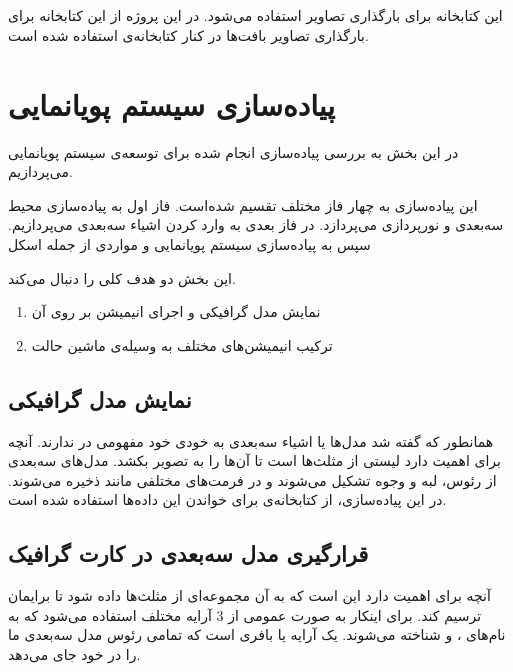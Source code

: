   
\subsection{}

این کتابخانه برای بارگذاری تصاویر استفاده می‌شود. در این پروژه از این کتابخانه برای بارگذاری
تصاویر بافت‌ها در کنار کتابخانه‌ی 
استفاده شده است.
\cite{stb}


\section{پیاده‌سازی سیستم پویانمایی}

در این بخش به بررسی پیاده‌سازی انجام شده برای توسعه‌ی سیستم پویانمایی 
می‌پردازیم.



این پیاده‌سازی به چهار فاز مختلف تقسیم شده‌است.
فاز اول به پیاده‌سازی محیط سه‌بعدی و نورپردازی می‌پردازد. 
در فاز بعدی به وارد کردن اشیاء سه‌بعدی می‌پردازیم.
سپس به پیاده‌سازی سیستم پویانمایی و مواردی از جمله اسکل

این بخش دو هدف کلی را دنبال می‌کند.

\begin{enumerate}
	\item نمایش مدل گرافیکی و اجرای انیمیشن بر روی ‌آن
	\item ترکیب انیمیشن‌های مختلف به وسیله‌ی ماشین حالت

\end{enumerate}

\subsection{نمایش مدل گرافیکی}

همانطور که گفته شد مدل‌ها یا اشیاء سه‌بعدی به خودی خود مفهومی در 
ندارند. آنچه برای 
اهمیت دارد لیستی از مثلث‌ها است تا آن‌ها را به تصویر بکشد.
مدل‌های سه‌بعدی از رئوس، لبه و وجوه تشکیل می‌شوند و در فرمت‌های مختلفی مانند
ذخیره می‌شوند. در این پیا‌ده‌سازی، از کتابخانه‌ی 
برای خواندن این داده‌ها استفاده شده است.

\subsection{قرارگیری مدل سه‌بعدی در کارت گرافیک}

آنچه برای 
 اهمیت دارد این است که به آن مجموعه‌ای از مثلث‌ها داده شود تا برایمان ترسیم کند.
برای اینکار به صورت عمومی از 3 آرایه مختلف استفاده می‌شود که به نام‌های 
،
و 
شناخته می‌شوند.
یک آرایه یا بافری است که تمامی رئوس مدل سه‌بعدی ما را در خود جای می‌دهد.

